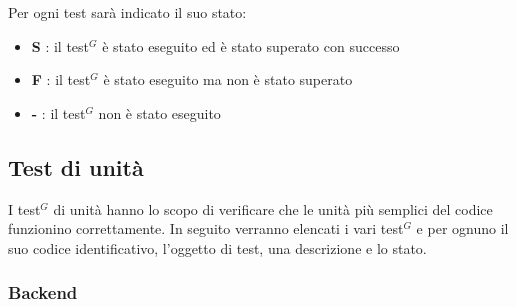 \documentclass[a4paper,10pt]{article}
\begin{document}
Per ogni test sarà indicato il suo stato:
\begin{itemize}
    \item \textbf{S} : il test$^G$ è stato eseguito ed è stato superato con successo
    \item \textbf{F} : il test$^G$ è stato eseguito ma non è stato superato
    \item \textbf{-} : il test$^G$ non è stato eseguito
\end{itemize}

\subsection{Test di unità}
I test$^G$ di unità hanno lo scopo di verificare che le unità più semplici del codice funzionino correttamente. In seguito verranno elencati i vari test$^G$ e per ognuno il suo codice identificativo, l'oggetto di test, una descrizione e lo stato. \\

\subsubsection{Backend}


\newcommand{\testU}{%
    \stepcounter{TU@}%
    \noindent{TU-\arabic{TU@}}\quad\par
}
\end{document}
